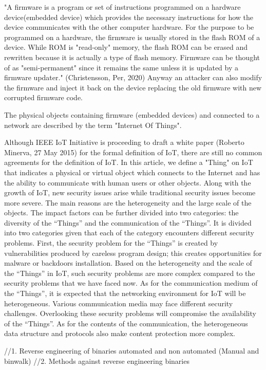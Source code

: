 \documentclass[]{report}
\begin{document}
"A firmware is a program or set of instructions programmed on a hardware device(embedded device) which provides the necessary instructions for how the device communicates with the other computer hardware. For the purpose to be programmed on a hardware, the firmware is usually stored in the flash ROM of a device. While ROM is "read-only" memory, the flash ROM can be erased and rewritten because it is actually a type of flash memory. Firmware can be thought of as "semi-permanent" since it remains the same unless it is updated by a firmware updater." (Christensson, Per, 2020) Anyway an attacker can also modify the firmware and inject it back on the device replacing the old firmware with new corrupted firmware code.

The physical objects containing firmware (embedded devices) and connected to a network are described by the term "Internet Of Things".

Although IEEE IoT Initiative is proceeding to draft a white
paper (Roberto Minerva, 27 May 2015) for the formal definition of IoT, there are still no
common agreements for the definition of IoT. In this article,
we define a "Thing" on IoT that indicates a physical or
virtual object which connects to the Internet and has the
ability to communicate with human users or other objects.
Along with the growth of IoT, new security issues arise
while traditional security issues become more severe. The
main reasons are the heterogeneity and the large scale of the
objects. The impact factors can be further divided into two
categories: the diversity of the “Things” and the
communication of the “Things”. It is divided into two
categories given that each of the category encounters
different security problems.
First, the security problem for the “Things” is created by
vulnerabilities produced by careless program design; this
creates opportunities for malware or backdoors installation.
Based on the heterogeneity and the scale of the “Things” in
IoT, such security problems are more complex compared to
the security problems that we have faced now.
As for the communication medium of the “Things”, it is
expected that the networking environment for IoT will be
heterogeneous. Various communication media may face
different security challenges. Overlooking these security
problems will compromise the availability of the “Things”.
As for the contents of the communication, the heterogeneous
data structure and protocols also make content protection more complex.

//1. Reverse engineering of binaries automated and non automated (Manual and binwalk)
//2. Methods against reverse engineering binaries
\end{document}
